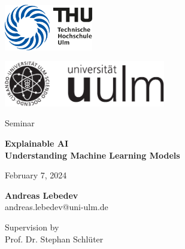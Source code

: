 \thispagestyle{empty}

\begin{minipage}{0.3\textwidth}
    \flushleft
    \includegraphics[height=2cm]{init/thu_logo.pdf}
\end{minipage}
\hfill
\begin{minipage}{0.6\textwidth}
    \flushright
    \includegraphics[height=2cm]{init/Logo_uulm_Vorlage_100mm_schwarz.pdf}\\
\end{minipage}

\vfill
\begin{center}
{
    \Large Seminar
}
\end{center}

\vspace{10mm}
\begin{center}
{
    \bf \Huge Explainable AI \\
    \vspace{3mm}
    \Large Understanding Machine Learning Models
}
\end{center}

\vspace{8mm}
\begin{center}
{ 
    \Large 
    February 7, 2024
}
\end{center}

\vspace{8mm}
\begin{center}
{
    \large {\bf Andreas Lebedev}\\
    \vspace{1mm}
    \footnotesize andreas.lebedev@uni-ulm.de\\
}
\end{center}

\vfill
Supervision by \\
Prof. Dr. Stephan Schlüter
